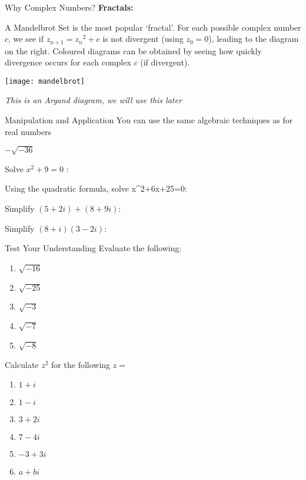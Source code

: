 \documentclass{beamer}
\begin{document}
	\begin{frame}[shrink=15]{Why Complex Numbers?}
        \textbf{Fractals:}
        
        A Mandelbrot Set is the most popular ‘fractal’. For each possible complex number $c$, we see if $z_{n+1} = {z_n}^2 + c$ is not divergent (using $z_0 = 0$), leading to the diagram on the right. Coloured diagrams can be obtained by seeing how quickly divergence occurs for each complex $c$ (if divergent).  
        
        \texttt{[image: mandelbrot]}
        
        \emph{This is an Argand diagram, we will use this later}
        
	\end{frame}
	
	\begin{frame}[shrink=15]{Manipulation and Application}
	    \alert<1>{You can use the same algebraic techniques as for real numbers}

	    $-\sqrt{-36}$ 
	    
	    Solve $x^2+9=0$ : 
	    
	    Using the quadratic formula, solve x^2+6x+25=0: 
	    
	    Simplify $(5+2i)+(8+9i)$: 
	    
	    Simplify $(8+i)(3-2i)$: 
	\end{frame}
	
	\begin{frame}[shrink=15]{Test Your Understanding}
	    Evaluate the following:
	    \begin{enumerate}[label={(\alph*)}]
	        \item $\sqrt{-16}$ 
	        \item $\sqrt{-25}$ 
	        \item $\sqrt{-3}$ 
	        \item $\sqrt{-7}$ 
	        \item $\sqrt{-8}$ 
	    \end{enumerate}
	    
	    Calculate $z^2$ for the following $z=$
	    \begin{enumerate}[label={(\alph*)}]
	        \item $1+i$ 
	        \item $1-i$ 
	        \item $3+2i$ 
	        \item $7-4i$ 
	        \item $-3+3i$ 
	        \item $a+bi$ 
	    \end{enumerate}
	    
	\end{frame}
	
\end{document}
